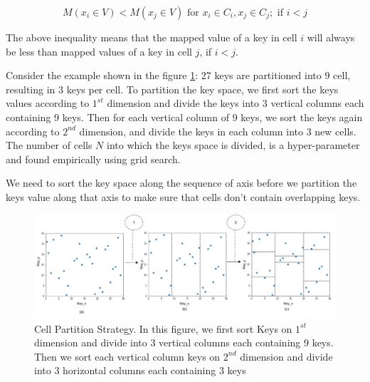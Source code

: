 
    $$ M(x_{i} \in V) <  M(x_{j} \in V) \text{ for } x_{i} \in C_{i}, x_{j} \in C_{j}; \text{ if } i<j$$
    
The above inequality means that the mapped value of a key in cell $i$ will always be less than mapped values of a key in cell $j$, if $i <j$.

\begin{mscexample}
	Consider the example shown in the figure \ref{fig:Cell_Parttion}: 27 keys are partitioned into $9$ cell,  resulting in $3$ keys per cell. To partition the key space, we first sort the keys values according to $1^{st}$ dimension and divide the keys into $3$ vertical columns each containing $9$ keys. Then for each vertical column of $9$ keys, we sort the keys again according to $2^{nd}$ dimension, and divide the keys in each column into $3$ new cells. The number of cells $N$ into which the keys space is divided, is a hyper-parameter and found empirically using grid search.

\end{mscexample}

We need to sort the key space along the sequence of axis before we partition the keys value along that axis to make sure that cells don't contain overlapping keys.

\begin{figure}[t]
    \centering
    \includegraphics[width=1\textwidth]{graphs/implementation/cell_generation.pdf}
    \caption{Cell Partition Strategy. In this figure, we first sort Keys on $1^{st}$ dimension and divide into 3 vertical columns each containing 9 keys. Then we sort each vertical column keys on $2^{nd}$ dimension and divide into 3 horizontal columns each containing 3 keys}
    \label{fig:Cell_Parttion}
\end{figure}

